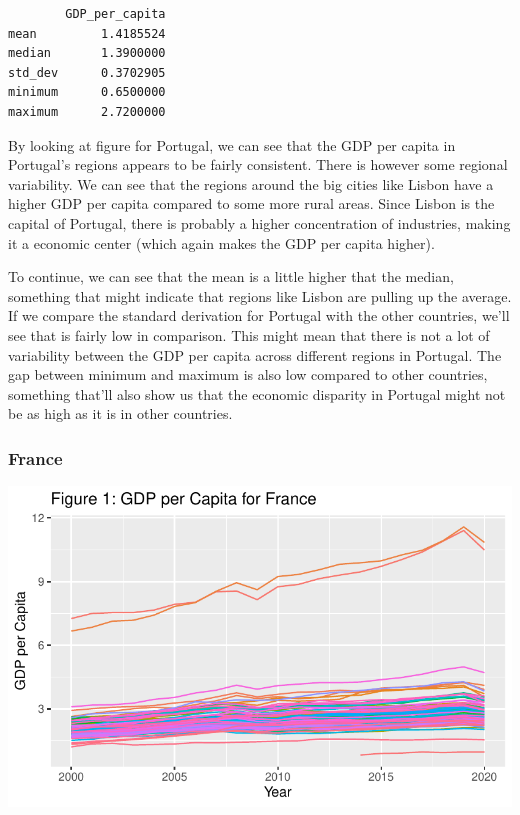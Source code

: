 \documentclass[
  a4paper,
  DIV=11,
  numbers=noendperiod]{scrartcl}
\begin{document}
\begin{verbatim}
        GDP_per_capita
mean         1.4185524
median       1.3900000
std_dev      0.3702905
minimum      0.6500000
maximum      2.7200000
\end{verbatim}

By looking at figure for Portugal, we can see that the GDP per capita in
Portugal's regions appears to be fairly consistent. There is however
some regional variability. We can see that the regions around the big
cities like Lisbon have a higher GDP per capita compared to some more
rural areas. Since Lisbon is the capital of Portugal, there is probably
a higher concentration of industries, making it a economic center (which
again makes the GDP per capita higher).

To continue, we can see that the mean is a little higher that the
median, something that might indicate that regions like Lisbon are
pulling up the average. If we compare the standard derivation for
Portugal with the other countries, we'll see that is fairly low in
comparison. This might mean that there is not a lot of variability
between the GDP per capita across different regions in Portugal. The gap
between minimum and maximum is also low compared to other countries,
something that'll also show us that the economic disparity in Portugal
might not be as high as it is in other countries.

\hypertarget{france}{%
\subsubsection{France}\label{france}}

\includegraphics{MSB104_GR_1_Final_Assignment_research_article_files/figure-pdf/unnamed-chunk-10-1.pdf}
\end{document}

